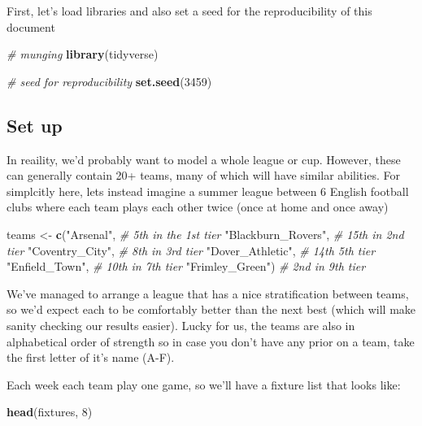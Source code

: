 \documentclass[]{article}
\newenvironment{Shaded}{\begin{snugshade}}{\end{snugshade}}
\newcommand{\KeywordTok}[1]{\textcolor[rgb]{0.13,0.29,0.53}{\textbf{#1}}}
\newcommand{\DecValTok}[1]{\textcolor[rgb]{0.00,0.00,0.81}{#1}}
\newcommand{\StringTok}[1]{\textcolor[rgb]{0.31,0.60,0.02}{#1}}
\newcommand{\CommentTok}[1]{\textcolor[rgb]{0.56,0.35,0.01}{\textit{#1}}}
\newcommand{\NormalTok}[1]{#1}
\begin{document}
First, let's load libraries and also set a seed for the reproducibility
of this document

\begin{Shaded}
\begin{Highlighting}[]
\CommentTok{# munging}
\KeywordTok{library}\NormalTok{(tidyverse)}

\CommentTok{# seed for reproducibility}
\KeywordTok{set.seed}\NormalTok{(}\DecValTok{3459}\NormalTok{)}
\end{Highlighting}
\end{Shaded}

\subsection{Set up}\label{set-up}

In reaility, we'd probably want to model a whole league or cup. However,
these can generally contain 20+ teams, many of which will have similar
abilities. For simplcitly here, lets instead imagine a summer league
between 6 English football clubs where each team plays each other twice
(once at home and once away)

\begin{Shaded}
\begin{Highlighting}[]
\NormalTok{teams <-}\StringTok{ }\KeywordTok{c}\NormalTok{(}\StringTok{"Arsenal"}\NormalTok{, }\CommentTok{# 5th in the 1st tier}
           \StringTok{"Blackburn_Rovers"}\NormalTok{, }\CommentTok{# 15th in 2nd tier}
           \StringTok{"Coventry_City"}\NormalTok{, }\CommentTok{# 8th in 3rd tier}
           \StringTok{"Dover_Athletic"}\NormalTok{, }\CommentTok{# 14th 5th tier }
           \StringTok{"Enfield_Town"}\NormalTok{, }\CommentTok{# 10th in 7th tier}
           \StringTok{"Frimley_Green"}\NormalTok{) }\CommentTok{# 2nd in 9th tier}
\end{Highlighting}
\end{Shaded}

We've managed to arrange a league that has a nice stratification between
teams, so we'd expect each to be comfortably better than the next best
(which will make sanity checking our results easier). Lucky for us, the
teams are also in alphabetical order of strength so in case you don't
have any prior on a team, take the first letter of it's name (A-F).

Each week each team play one game, so we'll have a fixture list that
looks like:

\begin{Shaded}
\begin{Highlighting}[]
\KeywordTok{head}\NormalTok{(fixtures, }\DecValTok{8}\NormalTok{)}
\end{Highlighting}
\end{Shaded}
\end{document}

